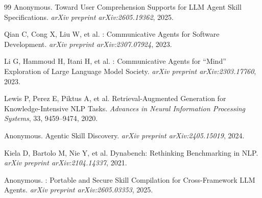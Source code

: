 \documentclass[12pt,a4paper]{ctexart}
\begin{document}
\begin{thebibliography}{99}
Anonymous.
\newblock Toward User Comprehension Supports for {LLM} Agent Skill Specifications.
\newblock \emph{arXiv preprint arXiv:2605.19362}, 2025.

Qian C, Cong X, Liu W, et al.
: Communicative Agents for Software Development.
\newblock \emph{arXiv preprint arXiv:2307.07924}, 2023.

Li G, Hammoud H, Itani H, et al.
: Communicative Agents for ``Mind'' Exploration of Large Language Model Society.
\newblock \emph{arXiv preprint arXiv:2303.17760}, 2023.

Lewis P, Perez E, Piktus A, et al.
\newblock Retrieval-Augmented Generation for Knowledge-Intensive {NLP} Tasks.
\newblock \emph{Advances in Neural Information Processing Systems}, 33, 9459--9474, 2020.

Anonymous.
\newblock Agentic Skill Discovery.
\newblock \emph{arXiv preprint arXiv:2405.15019}, 2024.

Kiela D, Bartolo M, Nie Y, et al.
\newblock Dynabench: Rethinking Benchmarking in {NLP}.
\newblock \emph{arXiv preprint arXiv:2104.14337}, 2021.

Anonymous.
: Portable and Secure Skill Compilation for Cross-Framework {LLM} Agents.
\newblock \emph{arXiv preprint arXiv:2605.03353}, 2025.

\end{thebibliography}
\end{document}
